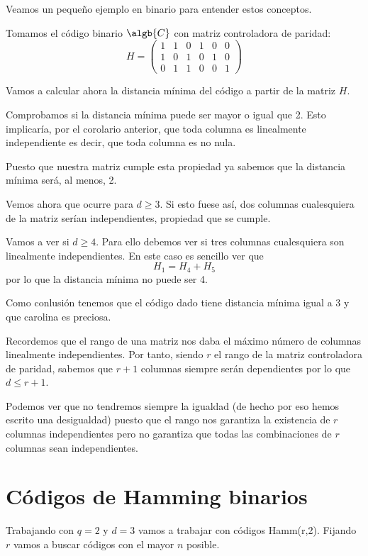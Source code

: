 Veamos un pequeño ejemplo en binario para entender estos conceptos.
\begin{example}
Tomamos el código binario $\algb{C}$ con matriz controladora de paridad:
\[H = \left(\begin{array}{cccccc}
1 & 1 & 0 & 1 & 0 & 0 \\
1 & 0 & 1 & 0 & 1 & 0\\
0 & 1 & 1 & 0 & 0 & 1
\end{array}\right) \]

Vamos a calcular ahora la distancia mínima del código a partir de la matriz $H$.

Comprobamos si la distancia mínima puede ser mayor o igual que 2. Esto implicaría, por el corolario anterior, que toda columna es linealmente independiente es decir, que toda columna es no nula.

Puesto que nuestra matriz cumple esta propiedad ya sabemos que la distancia mínima será, al menos, 2.

Vemos ahora que ocurre para $d\geq 3$. Si esto fuese así, dos columnas cualesquiera de la matriz serían independientes, propiedad que se cumple.

Vamos a ver si $d \geq 4$. Para ello debemos ver si tres columnas cualesquiera son linealmente independientes. En este caso es sencillo ver que
\[H_1=H_4+H_5\]
por lo que la distancia mínima no puede ser 4.

Como conlusión tenemos que el código dado tiene distancia mínima igual a 3 y que carolina es preciosa.
\end{example}

Recordemos que el rango de una matriz nos daba el máximo número de columnas linealmente independientes. Por tanto, siendo $r$ el rango de la matriz controladora de paridad, sabemos que $r+1$ columnas siempre serán dependientes por lo que $d\leq r+1$.

Podemos ver que no tendremos siempre la igualdad (de hecho por eso hemos escrito una desigualdad) puesto que el rango nos garantiza la existencia de $r$ columnas independientes pero no garantiza que todas las combinaciones de $r$ columnas sean independientes.

\section{Códigos de Hamming binarios}
Trabajando con $q=2$ y $d=3$ vamos a trabajar con códigos Hamm(r,2). Fijando $r$ vamos a buscar códigos con el mayor $n$ posible.

